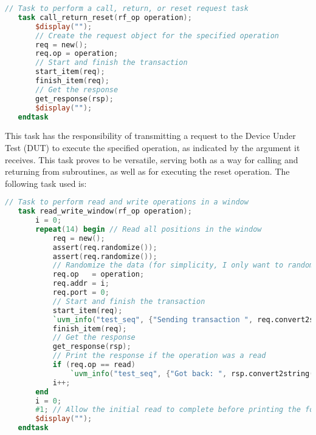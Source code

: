 \documentclass[12pt,a4paper]{report}
\begin{document}
\vspace{0.3cm}
\begin{lstlisting}[language=Verilog, caption= Return/Reset/Call task, label=lst:sysverilog]
// Task to perform a call, return, or reset request task
   task call_return_reset(rf_op operation);
       $display("");
       // Create the request object for the specified operation
       req = new();
       req.op = operation;
       // Start and finish the transaction
       start_item(req);
       finish_item(req);
       // Get the response        
       get_response(rsp);
       $display("");
   endtask
\end{lstlisting}
\vspace{0.3cm}
This task has the responsibility of transmitting a request to the Device Under Test (DUT) to execute the specified operation, as indicated by the argument it receives. This task proves to be versatile, serving both as a way for calling and returning from subroutines, as well as for executing the reset operation. 
The following task used is:
\vspace{0.3cm}
\begin{lstlisting}[language=Verilog, caption= Read & Write request task, label=lst:sysverilog]
// Task to perform read and write operations in a window
   task read_write_window(rf_op operation);
       i = 0;  
       repeat(14) begin // Read all positions in the window
           req = new();
           assert(req.randomize()); 
           assert(req.randomize()); 
           // Randomize the data (for simplicity, I only want to randomize the data)
           req.op   = operation;
           req.addr = i;
           req.port = 0;
           // Start and finish the transaction
           start_item(req);
           `uvm_info("test_seq", {"Sending transaction ", req.convert2string()}, UVM_HIGH);
           finish_item(req);
           // Get the response        
           get_response(rsp);      
           // Print the response if the operation was a read
           if (req.op == read)
               `uvm_info("test_seq", {"Got back: ", rsp.convert2string()}, UVM_HIGH);
           i++;
       end 
       i = 0;
       #1; // Allow the initial read to complete before printing the following uvm_info
       $display("");
   endtask
\end{lstlisting}
\vspace{0.3cm}
\end{document}
